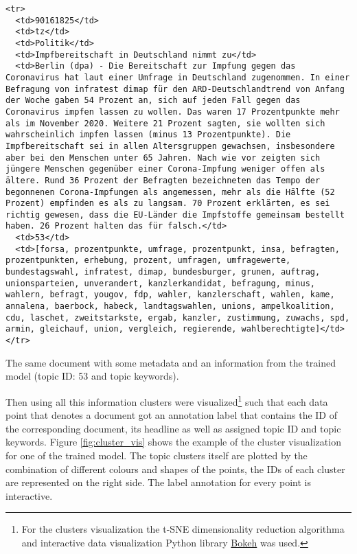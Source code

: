 \documentclass[fontsize=12pt,a4paper,twoside,openany]{scrbook}
\begin{document}
\begin{listing}[ht]
\begin{verbatim}
<tr>
  <td>90161825</td>
  <td>tz</td>
  <td>Politik</td>
  <td>Impfbereitschaft in Deutschland nimmt zu</td>
  <td>Berlin (dpa) - Die Bereitschaft zur Impfung gegen das Coronavirus hat laut einer Umfrage in Deutschland zugenommen. In einer Befragung von infratest dimap für den ARD-Deutschlandtrend von Anfang der Woche gaben 54 Prozent an, sich auf jeden Fall gegen das Coronavirus impfen lassen zu wollen. Das waren 17 Prozentpunkte mehr als im November 2020. Weitere 21 Prozent sagten, sie wollten sich wahrscheinlich impfen lassen (minus 13 Prozentpunkte). Die Impfbereitschaft sei in allen Altersgruppen gewachsen, insbesondere aber bei den Menschen unter 65 Jahren. Nach wie vor zeigten sich jüngere Menschen gegenüber einer Corona-Impfung weniger offen als ältere. Rund 36 Prozent der Befragten bezeichneten das Tempo der begonnenen Corona-Impfungen als angemessen, mehr als die Hälfte (52 Prozent) empfinden es als zu langsam. 70 Prozent erklärten, es sei richtig gewesen, dass die EU-Länder die Impfstoffe gemeinsam bestellt haben. 26 Prozent halten das für falsch.</td>
  <td>53</td>
  <td>[forsa, prozentpunkte, umfrage, prozentpunkt, insa, befragten, prozentpunkten, erhebung, prozent, umfragen, umfragewerte, bundestagswahl, infratest, dimap, bundesburger, grunen, auftrag, unionsparteien, unverandert, kanzlerkandidat, befragung, minus, wahlern, befragt, yougov, fdp, wahler, kanzlerschaft, wahlen, kame, annalena, baerbock, habeck, landtagswahlen, unions, ampelkoalition, cdu, laschet, zweitstarkste, ergab, kanzler, zustimmung, zuwachs, spd, armin, gleichauf, union, vergleich, regierende, wahlberechtigte]</td>
</tr>
\end{verbatim}
\caption{The same document with some metadata and an information from the trained model (topic ID: 53 and topic keywords).} 
\label{listing:data-example}
\end{listing}

Then using all this information clusters were visualized\footnote{For the clusters visualization the t-SNE dimensionality reduction algorithma and interactive data visualization Python library \href{https://bokeh.org/}{Bokeh} was used.} such that each data point that denotes a document got an annotation label that contains the ID of the corresponding document, its headline as well as assigned topic ID and topic keywords. Figure \ref{fig:cluster_vis} shows the example of the cluster visualization for one of the trained model. The topic clusters itself are plotted by the combination of different colours and shapes of the points, the IDs of each cluster are represented on the right side. The label annotation for every point is interactive. 
\end{document}
